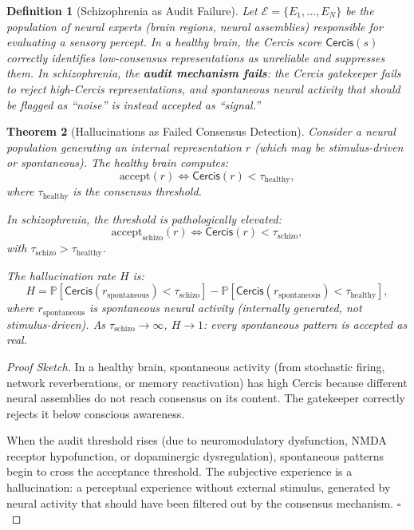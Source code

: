 \documentclass[12pt,a4paper]{article}
\newtheorem{theorem}{Theorem}[section]
\newtheorem{definition}[theorem]{Definition}
\theoremstyle{remark}
\newcommand{\Pbb}{\mathbb{P}}
\newcommand{\Cercis}{\textsf{Cercis}}
\begin{document}
\begin{definition}[Schizophrenia as Audit Failure]\label{def:schizo-audit}
Let $\mathcal{E} = \{E_1, \ldots, E_N\}$ be the population of neural experts
(brain regions, neural assemblies) responsible for evaluating a sensory
percept. In a healthy brain, the \Cercis{} score $\Cercis(s)$ correctly
identifies low-consensus representations as unreliable and suppresses them.
In schizophrenia, the \textbf{audit mechanism fails}: the \Cercis{} gatekeeper
fails to reject high-Cercis representations, and spontaneous neural activity
that should be flagged as ``noise'' is instead accepted as ``signal.''
\end{definition}

\begin{theorem}[Hallucinations as Failed Consensus Detection]\label{thm:schizo-audit}
Consider a neural population generating an internal representation $r$ (which
may be stimulus-driven or spontaneous). The healthy brain computes:
\begin{equation}\label{eq:healthy-audit}
    \text{accept}(r) \iff \Cercis(r) < \tau_{\text{healthy}},
\end{equation}
where $\tau_{\text{healthy}}$ is the consensus threshold.

In schizophrenia, the threshold is pathologically elevated:
\begin{equation}\label{eq:schizo-audit}
    \text{accept}_{\text{schizo}}(r) \iff \Cercis(r) < \tau_{\text{schizo}},
\end{equation}
with $\tau_{\text{schizo}} > \tau_{\text{healthy}}$.

The hallucination rate $H$ is:
\begin{equation}\label{eq:hallucination-rate}
    H = \Pbb[\Cercis(r_{\text{spontaneous}}) < \tau_{\text{schizo}}] - \Pbb[\Cercis(r_{\text{spontaneous}}) < \tau_{\text{healthy}}],
\end{equation}
where $r_{\text{spontaneous}}$ is spontaneous neural activity (internally
generated, not stimulus-driven). As $\tau_{\text{schizo}} \to \infty$,
$H \to 1$: every spontaneous pattern is accepted as real.
\end{theorem}

\begin{proof}[Proof Sketch]
In a healthy brain, spontaneous activity (from stochastic firing, network
reverberations, or memory reactivation) has high \Cercis{} because different
neural assemblies do not reach consensus on its content. The gatekeeper
correctly rejects it below conscious awareness.

When the audit threshold rises (due to neuromodulatory dysfunction, NMDA
receptor hypofunction, or dopaminergic dysregulation), spontaneous patterns
begin to cross the acceptance threshold. The subjective experience is a
hallucination: a perceptual experience without external stimulus, generated
by neural activity that should have been filtered out by the consensus
mechanism. $\square$
\end{proof}
\end{document}

